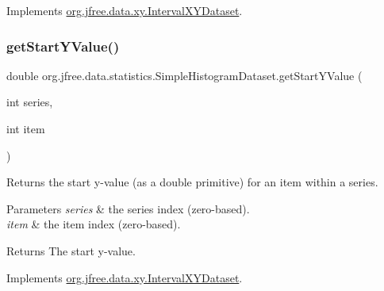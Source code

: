 Implements \mbox{\hyperlink{interfaceorg_1_1jfree_1_1data_1_1xy_1_1_interval_x_y_dataset_afdd414735adb233734bc35b76a005ed9}{org.\+jfree.\+data.\+xy.\+Interval\+X\+Y\+Dataset}}.

\mbox{\label{classorg_1_1jfree_1_1data_1_1statistics_1_1_simple_histogram_dataset_a90ea760c22d437e38065981fa87e0be3}} 
\subsubsection{\texorpdfstring{get\+Start\+Y\+Value()}{getStartYValue()}}
{\footnotesize\ttfamily double org.\+jfree.\+data.\+statistics.\+Simple\+Histogram\+Dataset.\+get\+Start\+Y\+Value (\begin{DoxyParamCaption}\item[{int}]{series,  }\item[{int}]{item }\end{DoxyParamCaption})}

Returns the start y-\/value (as a double primitive) for an item within a series.


\begin{DoxyParams}{Parameters}
{\em series} & the series index (zero-\/based). \\
\hline
{\em item} & the item index (zero-\/based).\\
\hline
\end{DoxyParams}
\begin{DoxyReturn}{Returns}
The start y-\/value. 
\end{DoxyReturn}


Implements \mbox{\hyperlink{interfaceorg_1_1jfree_1_1data_1_1xy_1_1_interval_x_y_dataset_aed1acf6e36561ce5acc3f6811a2ecef9}{org.\+jfree.\+data.\+xy.\+Interval\+X\+Y\+Dataset}}.

\mbox{\label{classorg_1_1jfree_1_1data_1_1statistics_1_1_simple_histogram_dataset_a2e2e54d5364b95e41b7643061b9d1b58}} 

